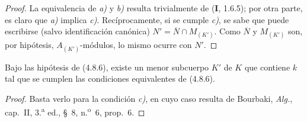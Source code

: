 
\begin{proof}
La equivalencia de \emph{a)} y \emph{b)} resulta trivialmente de (\textbf I, 1.6.5); por otra parte,
es claro que \emph{a)} implica \emph{c)}. Recíprocamente, si se cumple \emph{c)}, se sabe que puede
escribirse (salvo identificación canónica)
$N'=\overline N\cap M_{(K')}$. Como $\overline N$ y $M_{(K')}$ son, por
hipótesis, $A_{(K')}$-módulos, lo mismo ocurre con $N'$.
\end{proof}

\begin{corollary}[4.8.7]
\label{IV.2.4.8.7-fr}
Bajo las hipótesis de \textup{(4.8.6)}, existe un menor subcuerpo $K'$ de $K$ que
contiene $k$ tal que se cumplen las condiciones equivalentes de \textup{(4.8.6)}.
\end{corollary}

\begin{proof}
Basta verlo para la condición \emph{c)}, en cuyo caso resulta de Bourbaki,
\emph{Alg.}, cap.~II, 3.\textsuperscript{a} ed., \S~8,
n.\textsuperscript{o}~6, prop.~6.
\end{proof}
